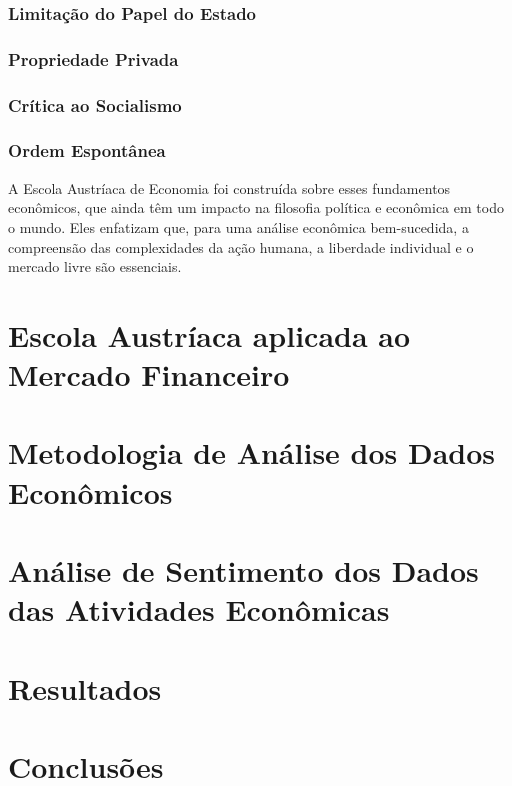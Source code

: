 \documentclass[a4paper,12pt]{article}
\begin{document}
\subsubsection{Limitação do Papel do Estado}
\subsubsection{Propriedade Privada}
\subsubsection{Crítica ao Socialismo }
\subsubsection{Ordem Espontânea}

\hspace{0.5cm}A Escola Austríaca de Economia foi construída sobre esses fundamentos econômicos, que ainda têm um impacto 
na filosofia política e econômica em todo o mundo. Eles enfatizam que, para uma análise econômica bem-sucedida,
a compreensão das complexidades da ação humana, a liberdade individual e o mercado livre são essenciais.

\section{Escola Austr\'iaca aplicada ao Mercado Financeiro}

\section{Metodologia de An\'alise dos Dados Econ\^omicos}

\section{An\'alise de Sentimento dos Dados das Atividades Econ\^omicas}

\section{Resultados}

\section{Conclus\~oes}
\end{document}
